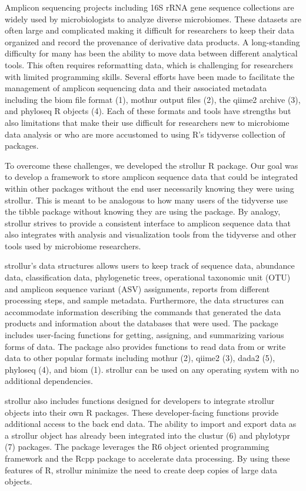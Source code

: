 \documentclass[
  11pt,
]{article}
\begin{document}
Amplicon sequencing projects including 16S rRNA gene sequence
collections are widely used by microbiologists to analyze diverse
microbiomes. These datasets are often large and complicated making it
difficult for researchers to keep their data organized and record the
provenance of derivative data products. A long-standing difficulty for
many has been the ability to move data between different analytical
tools. This often requires reformatting data, which is challenging for
researchers with limited programming skills. Several efforts have been
made to facilitate the management of amplicon sequencing data and their
associated metadata including the biom file format (1), mothur output
files (2), the qiime2 archive (3), and phyloseq R objects (4). Each of
these formats and tools have strengths but also limitations that make
their use difficult for researchers new to microbiome data analysis or
who are more accustomed to using R's tidyverse collection of packages.

To overcome these challenges, we developed the strollur R package. Our
goal was to develop a framework to store amplicon sequence data that
could be integrated within other packages without the end user
necessarily knowing they were using strollur. This is meant to be
analogous to how many users of the tidyverse use the tibble package
without knowing they are using the package. By analogy, strollur strives
to provide a consistent interface to amplicon sequence data that also
integrates with analysis and visualization tools from the tidyverse and
other tools used by microbiome researchers.

strollur's data structures allows users to keep track of sequence data,
abundance data, classification data, phylogenetic trees, operational
taxonomic unit (OTU) and amplicon sequence variant (ASV) assignments,
reports from different processing steps, and sample metadata.
Furthermore, the data structures can accommodate information describing
the commands that generated the data products and information about the
databases that were used. The package includes user-facing functions for
getting, assigning, and summarizing various forms of data. The package
also provides functions to read data from or write data to other popular
formats including mothur (2), qiime2 (3), dada2 (5), phyloseq (4), and
biom (1). strollur can be used on any operating system with no
additional dependencies.

strollur also includes functions designed for developers to integrate
strollur objects into their own R packages. These developer-facing
functions provide additional access to the back end data. The ability to
import and export data as a strollur object has already been integrated
into the clustur (6) and phylotypr (7) packages. The package leverages
the R6 object oriented programming framework and the Rcpp package to
accelerate data processing. By using these features of R, strollur
minimize the need to create deep copies of large data objects.
\end{document}
